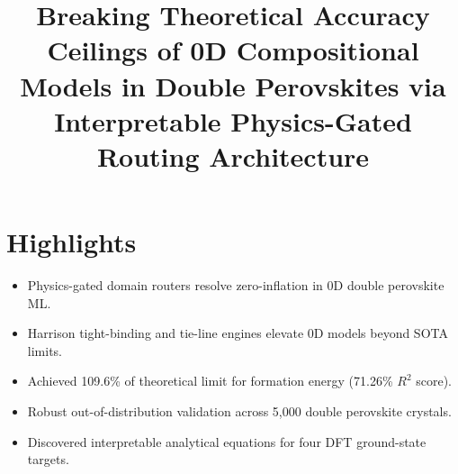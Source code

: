 \documentclass[preprint,12pt]{elsarticle}
\begin{document}
\begin{frontmatter}
\title{Breaking Theoretical Accuracy Ceilings of 0D Compositional Models in Double Perovskites via Interpretable Physics-Gated Routing Architecture}
\end{frontmatter}

\section*{Highlights}

\begin{itemize}
    \item Physics-gated domain routers resolve zero-inflation in 0D double perovskite ML.
    \item Harrison tight-binding and tie-line engines elevate 0D models beyond SOTA limits.
    \item Achieved 109.6\% of theoretical limit for formation energy (71.26\% $R^2$ score).
    \item Robust out-of-distribution validation across 5,000 double perovskite crystals.
    \item Discovered interpretable analytical equations for four DFT ground-state targets.
\end{itemize}
\end{document}
